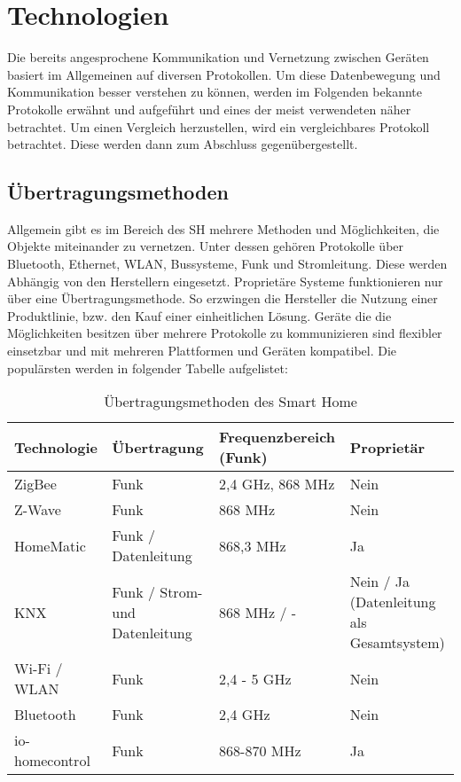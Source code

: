 \section{Technologien}
\label{sec:technologien}
    Die bereits angesprochene Kommunikation und Vernetzung zwischen Geräten basiert im Allgemeinen auf 
    diversen Protokollen. Um diese Datenbewegung und Kommunikation besser verstehen zu können, werden im 
    Folgenden bekannte Protokolle erwähnt und aufgeführt und eines der meist verwendeten näher betrachtet. 
    Um einen Vergleich herzustellen, wird ein vergleichbares Protokoll betrachtet. Diese werden dann zum 
    Abschluss gegenübergestellt. 

    \subsection{Übertragungsmethoden}
    \label{subsec:netzwerkprotokolle}
    Allgemein gibt es im Bereich des \acl{SH} mehrere Methoden und Möglichkeiten, die Objekte miteinander zu vernetzen. 
    Unter dessen gehören Protokolle über Bluetooth, Ethernet, WLAN, Bussysteme, Funk und Stromleitung. 
    Diese werden Abhängig von den Herstellern eingesetzt. Proprietäre Systeme funktionieren nur über eine 
    Übertragungsmethode. So erzwingen die Hersteller die Nutzung einer Produktlinie, bzw. den Kauf einer 
    einheitlichen Lösung. Geräte die die Möglichkeiten besitzen über mehrere Protokolle 
    zu kommunizieren sind flexibler einsetzbar und mit mehreren Plattformen und Geräten kompatibel.
    Die populärsten werden in folgender Tabelle aufgelistet: 
    \begin{table}[hbt!]
        \begin{center}
            \begin{tabular}{| p{3.25cm} | p{3.25cm} | p{3.25cm} | p{3.25cm} |}
                \hline
                    \textbf{Technologie} & \textbf{Übertragung} & \textbf{Frequenzbereich (Funk)} & \textbf{Proprietär} \\
                \hline
                    ZigBee & Funk & 2,4 GHz, 868 MHz & Nein \\ 
                \hline
                    Z-Wave & Funk & 868 MHz & Nein \\ 
                \hline
                    HomeMatic & Funk / Datenleitung & 868,3 MHz & Ja \\
                \hline
                    KNX & Funk / Strom- und Datenleitung & 868 MHz / - & Nein / Ja (Datenleitung als Gesamtsystem) \\
                \hline
                    Wi-Fi / WLAN & Funk & 2,4 - 5 GHz & Nein \\
                \hline 
                    Bluetooth & Funk & 2,4 GHz & Nein \\
                \hline
                    io-homecontrol & Funk & 868-870 MHz & Ja \\
                \hline
            \end{tabular}
        \end{center}
        \caption{Übertragungsmethoden des Smart Home}
        \label{tab:protocolsSH}
    \end{table}
